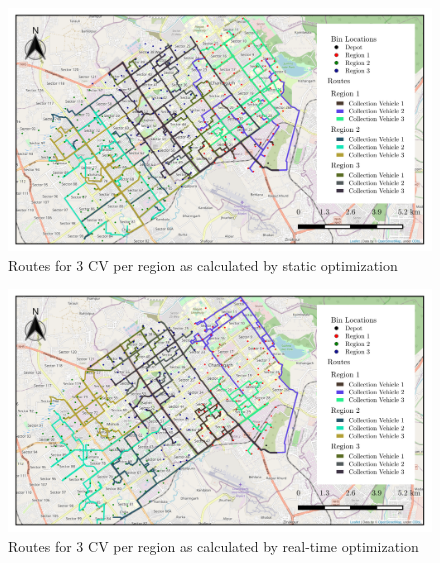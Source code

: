 \documentclass[12pt]{article}
\begin{document}
\begin{figure}[H]
    \centering
    \includegraphics[scale=0.55]{Static_Weighted_3_Truck.png} %
    \caption{Routes for 3 CV per region as calculated by static optimization}\label{fig4}
\end{figure}
\begin{figure}[H]
    \centering
    \includegraphics[scale=0.55]{Dynamic_weighted_3_Truck.png} %
    \caption{Routes for 3 CV per region as calculated by real-time optimization}\label{fig5}
\end{figure}
\end{document}
